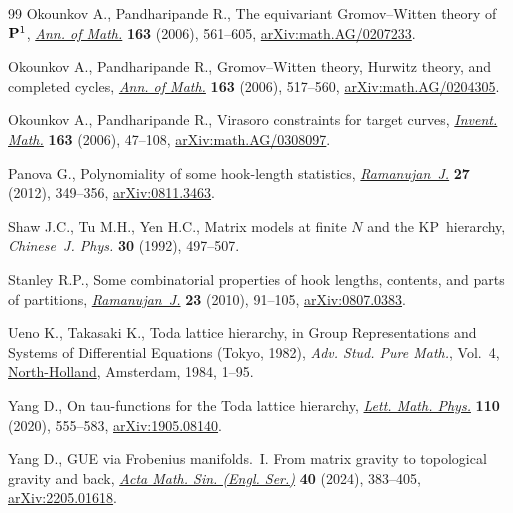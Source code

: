 \documentclass[pdftex]{sigma}
\numberwithin{equation}{section}
\begin{document}
\begin{thebibliography}{99}
Okounkov A., Pandharipande R., The equivariant {G}romov--{W}itten theory
 of~{${\bf P}^1$},
 \href{https://doi.org/10.4007/annals.2006.163.561}{\textit{Ann. of Math.}}
 \textbf{163} (2006), 561--605,
 \href{http://arxiv.org/abs/math.AG/0207233}{arXiv:math.AG/0207233}.

Okounkov A., Pandharipande R., {G}romov--{W}itten theory, {H}urwitz theory, and
 completed cycles,
 \href{https://doi.org/10.4007/annals.2006.163.517}{\textit{Ann. of Math.}}
 \textbf{163} (2006), 517--560,
 \href{http://arxiv.org/abs/math.AG/0204305}{arXiv:math.AG/0204305}.

Okounkov A., Pandharipande R., Virasoro constraints for target curves,
 \href{https://doi.org/10.1007/s00222-005-0455-y}{\textit{Invent. Math.}}
 \textbf{163} (2006), 47--108,
 \href{http://arxiv.org/abs/math.AG/0308097}{arXiv:math.AG/0308097}.

Panova G., Polynomiality of some hook-length statistics,
 \href{https://doi.org/10.1007/s11139-011-9332-z}{\textit{Ramanujan~J.}}
 \textbf{27} (2012), 349--356,
 \href{http://arxiv.org/abs/0811.3463}{arXiv:0811.3463}.

Shaw J.C., Tu M.H., Yen H.C., Matrix models at finite $N$ and the
 {KP}~hierarchy, \textit{Chinese~J. Phys.} \textbf{30} (1992), 497--507.

Stanley R.P., Some combinatorial properties of hook lengths, contents, and
 parts of partitions,
 \href{https://doi.org/10.1007/s11139-009-9185-x}{\textit{Ramanujan~J.}}
 \textbf{23} (2010), 91--105,
 \href{http://arxiv.org/abs/0807.0383}{arXiv:0807.0383}.

Ueno K., Takasaki K., Toda lattice hierarchy, in Group Representations and
 Systems of Differential Equations ({T}okyo, 1982), \textit{Adv. Stud. Pure
 Math.}, Vol.~4, \href{https://doi.org/10.2969/aspm/00410001}{North-Holland},
 Amsterdam, 1984, 1--95.

Yang D., On tau-functions for the {T}oda lattice hierarchy,
 \href{https://doi.org/10.1007/s11005-019-01232-5}{\textit{Lett. Math. Phys.}}
 \textbf{110} (2020), 555--583,
 \href{http://arxiv.org/abs/1905.08140}{arXiv:1905.08140}.

Yang D., G{UE} via {F}robenius manifolds.~{I}. {F}rom matrix gravity to
 topological gravity and back,
 \href{https://doi.org/10.1007/s10114-024-2258-3}{\textit{Acta Math. Sin.
 (Engl. Ser.)}} \textbf{40} (2024), 383--405,
 \href{http://arxiv.org/abs/2205.01618}{arXiv:2205.01618}.


\end{thebibliography}
\end{document}
